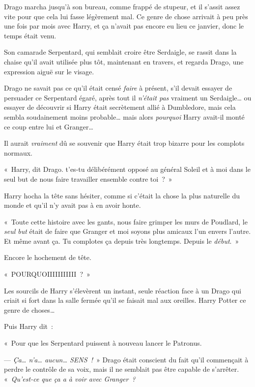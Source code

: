 Drago marcha jusqu'à son bureau, comme frappé de stupeur, et il s'assit assez vite pour que cela lui fasse légèrement mal. Ce genre de chose arrivait à peu près une fois par mois avec Harry, et ça n'avait pas encore eu lieu ce janvier, donc le temps était venu.

Son camarade Serpentard, qui semblait croire être Serdaigle, se rassit dans la chaise qu'il avait utilisée plus tôt, maintenant en travers, et regarda Drago, une expression aiguë sur le visage.

Drago ne savait pas ce qu'il était censé \emph{faire} à présent, s'il devait essayer de persuader ce Serpentard égaré, après tout il \emph{n'était pas} vraiment un Serdaigle… ou essayer de découvrir si Harry était secrètement allié à Dumbledore, mais cela sembla soudainement moins probable… mais alors \emph{pourquoi} Harry avait-il monté ce coup entre lui et Granger…

Il aurait \emph{vraiment} dû se souvenir que Harry était trop bizarre pour les complots normaux.

«~Harry, dit Drago. t'es-tu délibérément opposé au général Soleil et à moi dans le seul but de nous faire travailler ensemble contre toi~?~»

Harry hocha la tête sans hésiter, comme si c'était la chose la plus naturelle du monde et qu'il n'y avait pas à en avoir honte.

«~Toute cette histoire avec les gants, nous faire grimper les murs de Poudlard, le \emph{seul but} était de faire que Granger et moi soyons plus amicaux l'un envers l'autre. Et même avant ça. Tu complotes ça depuis très longtemps. Depuis le \emph{début}.~»

Encore le hochement de tête.

«~POURQUOIIIIIIIIIII~?~»

Les sourcils de Harry s'élevèrent un instant, seule réaction face à un Drago qui criait si fort dans la salle fermée qu'il se faisait mal aux oreilles.  Harry Potter  ce genre de choses…

Puis Harry dit~:

«~Pour que les Serpentard puissent à nouveau lancer le Patronus.

--- \emph{Ça… n'a… aucun… SENS~!}~» Drago était conscient du fait qu'il commençait à perdre le contrôle de sa voix, mais il ne semblait pas être capable de s'arrêter. «~\emph{Qu'est-ce que ça a à voir avec Granger~?}

